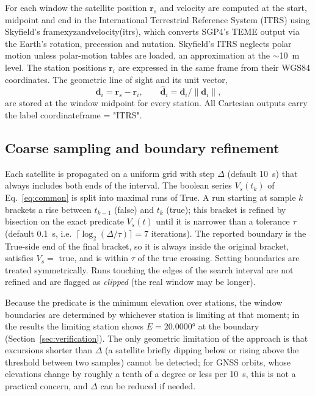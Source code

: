 \documentclass[11pt,a4paper]{article}
\newcommand{\code}[1]{{\ttfamily\def\_{\textunderscore\allowbreak}#1}}
\newcommand{\vect}[1]{\mathbf{#1}}
\begin{document}
For each window the satellite position $\vect r_s$ and velocity are computed
at the start, midpoint and end in the International Terrestrial Reference
System (ITRS) using Skyfield's \code{frame\_xyz\_and\_velocity(itrs)}, which
converts SGP4's TEME output via the Earth's rotation, precession and
nutation. Skyfield's ITRS neglects polar motion unless polar-motion tables
are loaded, an approximation at the $\sim$\SI{10}{\metre} level. The
station positions $\vect r_i$ are expressed in the same frame from their
WGS84 coordinates. The geometric line of sight and its unit vector,
\begin{equation}
\vect d_i = \vect r_s - \vect r_i, \qquad
\hat{\vect d}_i = \vect d_i / \lVert \vect d_i \rVert ,
\end{equation}
are stored at the window midpoint for every station. All Cartesian outputs
carry the label \code{coordinate\_frame = "ITRS"}.

\subsection{Coarse sampling and boundary refinement}

Each satellite is propagated on a uniform grid with step $\Delta$
(default \SI{10}{\second}) that always includes both ends of the interval.
The boolean series $V_s(t_k)$ of Eq.~\eqref{eq:common} is split into maximal
runs of \code{True}. A run starting at sample $k$ brackets a rise between
$t_{k-1}$ (false) and $t_k$ (true); this bracket is refined by bisection on
the exact predicate $V_s(t)$ until it is narrower than a tolerance $\tau$
(default \SI{0.1}{\second}, i.e.\ $\lceil\log_2(\Delta/\tau)\rceil = 7$
iterations). The reported boundary is the \code{True}-side end of the final
bracket, so it is always inside the original bracket, satisfies $V_s=$ true,
and is within $\tau$ of the true crossing. Setting boundaries are treated
symmetrically. Runs touching the edges of the search interval are not
refined and are flagged as \emph{clipped} (the real window may be longer).

Because the predicate is the minimum elevation over stations, the window
boundaries are determined by whichever station is limiting at that moment;
in the results the limiting station shows $E=\ang{20.0000}$ at the boundary
(Section~\ref{sec:verification}). The only geometric limitation of the
approach is that excursions shorter than $\Delta$ (a satellite briefly
dipping below or rising above the threshold between two samples) cannot be
detected; for GNSS orbits, whose elevations change by roughly a tenth of
a degree or less per \SI{10}{\second}, this is not a practical concern, and $\Delta$
can be reduced if needed.
\end{document}
